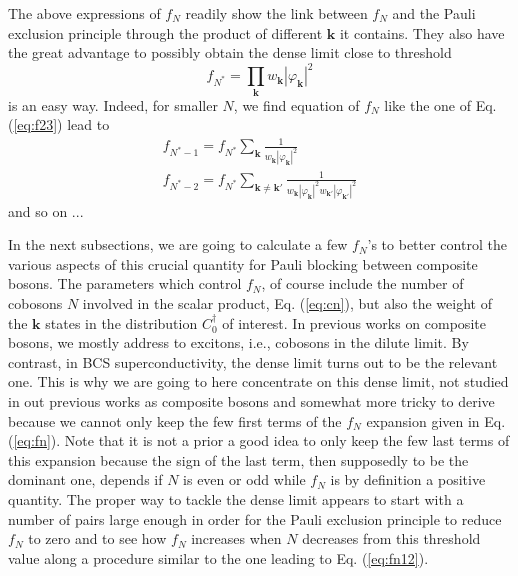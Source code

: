 \documentclass[aps,prb,preprint,groupedaddress,amsmath]{revtex4-1}
\newcommand{\vk}{\ensuremath{\mathbf{k}}}
\newcommand{\dg}{\ensuremath{\dagger}}
\begin{document}
 The above expressions of $f_N$ readily show the link between $f_N$ and the Pauli exclusion principle through the product of different  $\vk$ it contains. They also have the great advantage to possibly obtain the dense limit close to  threshold 
 \begin{equation}
 f_{N^*}=\prod_{\vk}w_{\vk}|\varphi_{\vk}|^2
 \end{equation}
 is an easy way. Indeed, for smaller $N$, we find equation of $f_N$ like the one of Eq. (\ref{eq:f23}) lead to 
 \begin{equation}\label{eq:fn12}
 \begin{split}
 f_{N^*-1}=f_{N^*}\sum_{\vk}\frac1{w_{\vk}|\varphi_{\vk}|^2}\\
 f_{N^*-2}=f_{N^*}\sum_{\vk\neq\vk'}\frac1{w_{\vk}|\varphi_{\vk}|^2w_{\vk'}|\varphi_{\vk'}|^2}
 \end{split}
 \end{equation}
 and so on ...  

In the next subsections, we are going to calculate a few $f_N$'s to better control the various aspects of this crucial quantity for Pauli blocking between composite bosons. The parameters which control $f_N$, of course include the number of cobosons $N$ involved in the scalar product, Eq. (\ref{eq:cn}), but also the weight of the $\vk$ states in the distribution $C^\dg_0$ of interest. In previous works on composite bosons, we mostly address to excitons, i.e., cobosons in the dilute limit. By contrast, in BCS superconductivity, the dense limit turns out to be the relevant one.  This is why we are going to here concentrate on this dense limit, not studied in out previous works as composite bosons and somewhat more tricky to derive because we cannot only keep the few first terms of the $f_N$ expansion given in Eq. (\ref{eq:fn}). Note that it is not a prior a good idea to only keep the few last terms of this expansion  because the sign of the last term, then supposedly to be the dominant one, depends if $N$ is even or odd while $f_N$ is by definition a positive quantity. The proper way to tackle the dense limit appears to start with a number of pairs large enough in order for the Pauli exclusion principle to  reduce $f_N$ to zero and to see how $f_N$ increases when $N$ decreases from this threshold value along a procedure similar to the one leading to Eq. (\ref{eq:fn12}).
\end{document}

